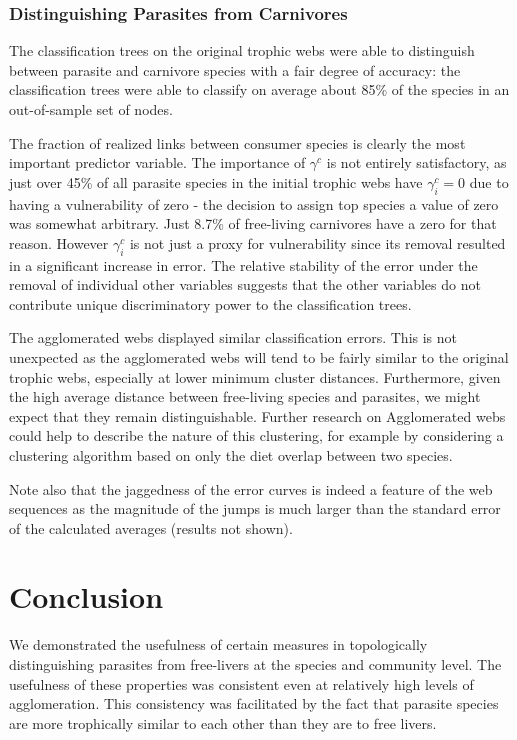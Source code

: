 \documentclass[../dissertation.tex]{subfiles}
\begin{document}
\subsubsection{Distinguishing Parasites from Carnivores} The classification
trees on the original trophic webs were able to distinguish between parasite
and carnivore species with a fair degree of accuracy: the classification trees
were able to classify on average about 85\% of the species in an out-of-sample
set of nodes. 

The fraction of realized links between consumer species is clearly the most
important predictor variable. The importance of $\gamma^{c}$ is not entirely
satisfactory, as just over 45\% of all parasite species in the initial trophic
webs have $\gamma^{c}_i=0$ due to having a vulnerability of zero - the
decision to assign top species a value of zero was somewhat arbitrary. Just
8.7\% of free-living carnivores have a zero for that reason. However
$\gamma^{c}_i$ is not just a proxy for vulnerability since its removal
resulted in a significant increase in error. The relative stability of the
error under the removal of individual other variables suggests that the other
variables do not contribute unique discriminatory power to the classification
trees.

The agglomerated webs displayed similar classification errors. This is not
unexpected as the agglomerated webs will tend to be fairly similar to the
original trophic webs, especially at lower minimum cluster distances.
Furthermore, given the high average distance between free-living species and
parasites, we might expect that they remain distinguishable. Further research
on Agglomerated webs could help to describe the nature of this clustering, for
example by considering a clustering algorithm based on only the diet overlap
between two species.

Note also that the jaggedness of the error curves is indeed a feature of the
web sequences as the magnitude of the jumps is much larger than the standard
error of the calculated averages (results not shown). 

\section{Conclusion} We demonstrated the usefulness of certain measures in
topologically distinguishing parasites from free-livers at the species and
community level. The usefulness of these properties was consistent even at
relatively high levels of agglomeration. This consistency was facilitated by
the fact that parasite species are more trophically similar to each other than
they are to free livers.




 
\end{document}
